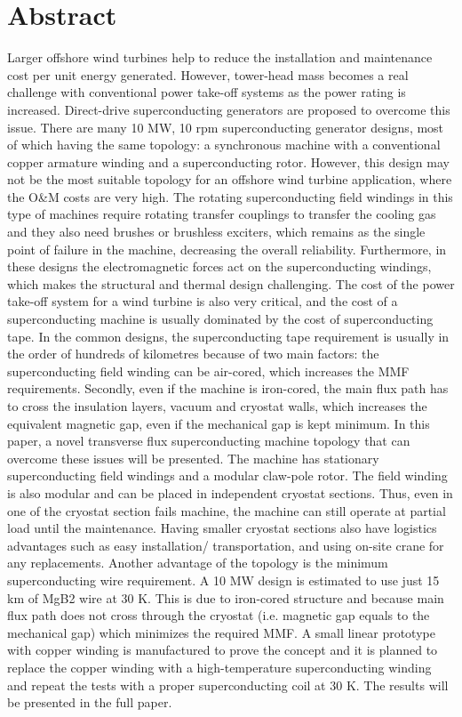 \documentclass[12pt]{IET02}
\begin{document}
\section*{Abstract}
Larger offshore wind turbines help to reduce the installation and maintenance cost per unit energy generated. However, tower-head mass becomes a real challenge with conventional power take-off systems as the power rating is increased. Direct-drive superconducting generators are proposed to overcome this issue. There are many 10 MW, 10 rpm superconducting generator designs, most of which having the same topology: a synchronous machine with a conventional copper armature winding and a superconducting rotor. However, this design may not be the most suitable topology for an offshore wind turbine application, where the O&M costs are very high. 
The rotating superconducting field windings in this type of machines require rotating transfer couplings to transfer the cooling gas and they also need brushes or brushless exciters, which remains as the single point of failure in the machine, decreasing the overall reliability. Furthermore, in these designs the electromagnetic forces act on the superconducting windings, which makes the structural and thermal design challenging.
The cost of the power take-off system for a wind turbine is also very critical, and the cost of a superconducting machine is usually dominated by the cost of superconducting tape. In the common designs, the superconducting tape requirement is usually in the order of hundreds of kilometres because of two main factors: the superconducting field winding can be air-cored, which increases the MMF requirements. Secondly, even if the machine is iron-cored, the main flux path has to cross the insulation layers, vacuum and cryostat walls, which increases the equivalent magnetic gap, even if the mechanical gap is kept minimum.
In this paper, a novel transverse flux superconducting machine topology that can overcome these issues will be presented. The machine has stationary superconducting field windings and a modular claw-pole rotor. The field winding is also modular and can be placed in independent cryostat sections. Thus, even in one of the cryostat section fails machine, the machine can still operate at partial load until the maintenance. Having smaller cryostat sections also have logistics advantages such as easy installation/ transportation, and using on-site crane for any replacements. Another advantage of the topology is the minimum superconducting wire requirement. A 10 MW design is estimated to use just 15 km of MgB2 wire at 30 K. This is due to iron-cored structure and because main flux path does not cross through the cryostat (i.e. magnetic gap equals to the mechanical gap) which minimizes the required MMF.
A small linear prototype with copper winding is manufactured to prove the concept and it is planned to replace the copper winding with a high-temperature superconducting winding and repeat the tests with a proper superconducting coil at 30 K. The results will be presented in the full paper.
\vspace{1pc}
\end{document}

